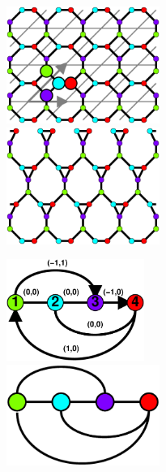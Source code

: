 \documentclass{beamer}
\begin{document}
\begin{frame}
  \begin{minipage}{2in}
     \begin{center}
         \includegraphics[height=1.5in]{periodic3a}\\
         \includegraphics[height=1.5in]{periodic1c}\\
     \end{center}
  \end{minipage}
  \begin{minipage}{1.8in}
     \begin{center}
       \includegraphics[height=1.3in]{periodic4a}\\
       \includegraphics[height=1.3in]{periodic1b}\\
     \end{center}
  \end{minipage}
\end{frame}
\end{document}
